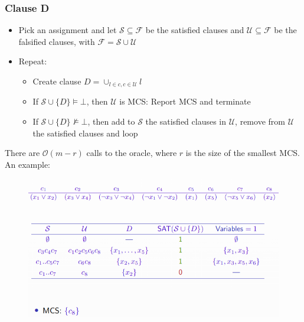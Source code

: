 \documentclass[10pt,a4paper]{report}
\begin{document}
\subsubsection{Clause D}
\begin{itemize}
    \item Pick an assignment and let $\mathcal{S} \subseteq \mathcal{F}$ be the satisfied clauses and $\mathcal{U} \subseteq \mathcal{F}$ be the falsified clauses, with $\mathcal{F} = \mathcal{S} \cup \mathcal{U}$
    \item Repeat:
    \begin{itemize}
        \item Create clause $D = \cup_{l \in c, c \in \mathcal{U}} l$
        \item If $\mathcal{S} \cup \{D\} \vDash \bot$, then $\mathcal{U}$ is MCS: Report MCS and terminate
        \item If $\mathcal{S} \cup \{D\} \nvDash \bot$, then add to $\mathcal{S}$ the satisfied clauses in $\mathcal{U}$, remove from $\mathcal{U}$ the satisfied clauses and loop
    \end{itemize}
\end{itemize}
There are $\mathcal{O}(m-r)$ calls to the oracle, where $r$ is the size of the smallest MCS. An example:
\begin{figure}[H]
    \centering
    \includegraphics[scale=0.4]{16.png}
\end{figure}
\end{document}
